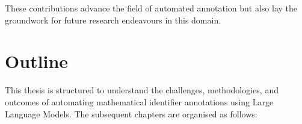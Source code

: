 
These contributions advance the field of automated annotation but also lay the groundwork for future research endeavours in this domain.

\section{Outline}

This thesis is structured to understand the challenges, methodologies, and outcomes of automating mathematical identifier annotations using Large Language Models. The subsequent chapters are organised as follows:

